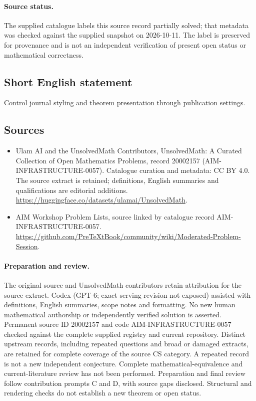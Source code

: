 \documentclass[11pt]{article}
\begin{document}
\paragraph{Source status.}
The supplied catalogue labels this source record partially solved; that metadata was checked against the supplied snapshot on 2026-10-11. The label is preserved for provenance and is not an independent verification of present open status or mathematical correctness.
\subsection{Short English statement}
Control journal styling and theorem presentation through publication settings.
\subsection{Sources}
\begin{itemize}
\item[\hypertarget{source:20002157:1}{S1}] Ulam AI and the UnsolvedMath Contributors, UnsolvedMath: A Curated Collection of Open Mathematics Problems, record 20002157 (AIM-INFRASTRUCTURE-0057). Catalogue curation and metadata: CC BY 4.0. The source extract is retained; definitions, English summaries and qualifications are editorial additions.
\url{https://huggingface.co/datasets/ulamai/UnsolvedMath}.
\item[\hypertarget{source:20002157:2}{S2}] AIM Workshop Problem Lists, source linked by catalogue record AIM-INFRASTRUCTURE-0057.
\url{https://github.com/PreTeXtBook/community/wiki/Moderated-Problem-Session}.
\end{itemize}
\paragraph{Preparation and review.}
The original source and UnsolvedMath contributors retain attribution for the source extract. Codex (GPT-6; exact serving revision not exposed) assisted with definitions, English summaries, scope notes and formatting. No new human mathematical authorship or independently verified solution is asserted. Permanent source ID 20002157 and code AIM-INFRASTRUCTURE-0057 checked against the complete supplied registry and current repository. Distinct upstream records, including repeated questions and broad or damaged extracts, are retained for complete coverage of the source CS category. A repeated record is not a new independent conjecture. Complete mathematical-equivalence and current-literature review has not been performed. Preparation and final review follow contribution prompts C and D, with source gaps disclosed. Structural and rendering checks do not establish a new theorem or open status.
\label{end:20002157}
\end{document}
